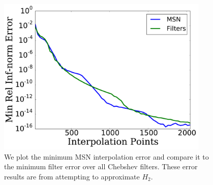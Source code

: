 
\begin{figure}[p]
    \centering
    \includegraphics[width=0.9\textwidth]{plots/msn_filter_comp_heaviside_2.pdf}
    \caption[Best MSN vs.~Best Filter Comparison: Heaviside Jump Function 2]{
    We plot the minimum MSN interpolation error and compare it
    to the minimum filter error over all Chebshev filters.
    These error results are from attempting to approximate $H_{2}$.
    }
\label{fig:msn_filter_comp_heaviside_2}
\end{figure}



